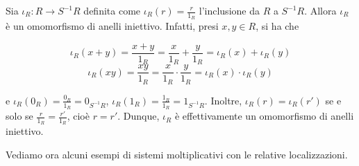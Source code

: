 \begin{obs}
  Sia $\iota_R\colon R\rightarrow S^{-1}R$ definita come $\iota_R(r)=\frac{r}{1_R}$ l'inclusione da $R$ a $S^{-1}R$. 
  Allora $\iota_R$ è un omomorfismo di anelli iniettivo. Infatti, presi $x,y\in R$, si ha che 
  
  \[\iota_R(x+y)=\frac{x+y}{1_R}=\frac{x}{1_R}+\frac{y}{1_R}=\iota_R(x)+\iota_R(y)\] 
  \[\iota_R(xy)=\frac{xy}{1_R}=\frac{x}{1_R}\cdot \frac{y}{1_R}=\iota_R(x)\cdot \iota_R(y)\] 
  
  \noindent e $\iota_R(0_R)=\frac{0_R}{1_R}=0_{S^{-1}R}$, $\iota_R(1_R)=\frac{1_R}{1_R}=1_{S^{-1}R}$. 
  Inoltre, $\iota_R(r)=\iota_R(r')$ se e solo se $\frac{r}{1_R}=\frac{r'}{1_R}$, cioè $r=r'$. 
  Dunque, $\iota_R$ è effettivamente un omomorfismo di anelli iniettivo. 
\end{obs}

\noindent Vediamo ora alcuni esempi di sistemi moltiplicativi con le relative localizzazioni.

